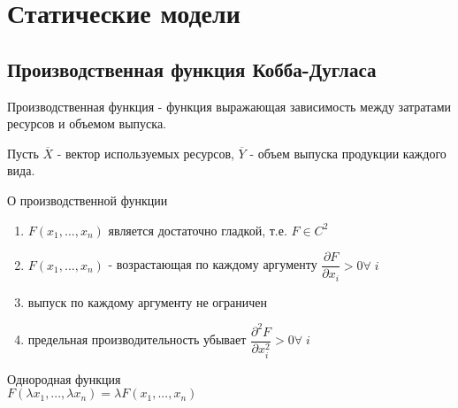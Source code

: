 %
%
%
%
% 
\section{Статические модели}
\subsection{Производственная функция Кобба-Дугласа}

\begin{definition}
  Производственная функция - функция выражающая зависимость между затратами ресурсов и объемом выпуска.
\end{definition}
Пусть $\overline{X}$ - вектор используемых ресурсов, $\overline{Y}$ - объем выпуска продукции каждого вида.
\begin{property}{О производственной функции}
\begin{enumerate}
  \item $F(x_1,...,x_n)$ является достаточно гладкой, т.е. $F\in C^2$
  \item $F(x_1,...,x_n)$ - возрастающая по каждому аргументу $\dfrac{\partial F}{\partial x_i}>0 \forall \;i$
  \item выпуск по каждому аргументу не ограничен
  \item предельная производительность убывает $ \dfrac{\partial^2 F}{\partial x_i^2}>0 \forall \;i$
\end{enumerate}
\end{property}

\begin{definition}{Однородная функция}
  \\$F(\lambda x_1, ...,\lambda x_n)=\lambda F(x_1,...,x_n)$
\end{definition}

